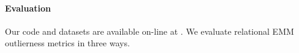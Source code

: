 {%
%
%
%
%
\paragraph{Evaluation} Our code and datasets are available on-line at \citep{url}. We evaluate relational EMM outlierness metrics in three ways.

}
